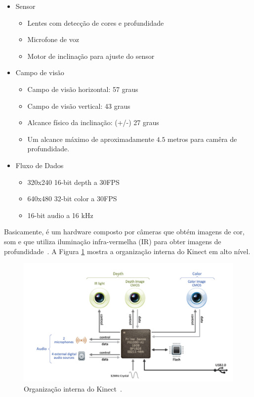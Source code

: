 	\begin{itemize}
		\item Sensor
			\begin{itemize}
				\item Lentes com detecção de cores e profundidade
				\item Microfone de voz
				\item Motor de inclinação para ajuste do sensor
			\end{itemize}
		\item Campo de visão
			\begin{itemize}
				\item Campo de visão horizontal: 57 graus
				\item Campo de visão vertical: 43 graus
				\item Alcance físico da inclinação: (+/-) 27 graus
				\item Um alcance máximo de aproximadamente $\displaystyle 4.5$ metros para camêra de profundidade. 
			\end{itemize}
		\item Fluxo de Dados
			\begin{itemize}
				\item 320x240 16-bit depth a 30FPS
				\item 640x480 32-bit color a 30FPS
				\item 16-bit audio a 16 kHz
			\end{itemize}
	\end{itemize}

Basicamente, é um hardware composto por câmeras que obtém imagens de cor, som e que utiliza iluminação infra-vermelha (IR) para obter imagens de profundidade~\cite{kinect}. A Figura \ref{kinect_interno} mostra a organização interna do Kinect em alto nível.

	\begin{figure}[hbt]
		\begin{center}
			\includegraphics[scale=0.8]{figuras/2.FundamentacaoTeorica/kinect_interno.png}
		\end{center}
		\caption{Organização interna do Kinect~\cite{kinect}.}
		\label{kinect_interno}
	\end{figure}

